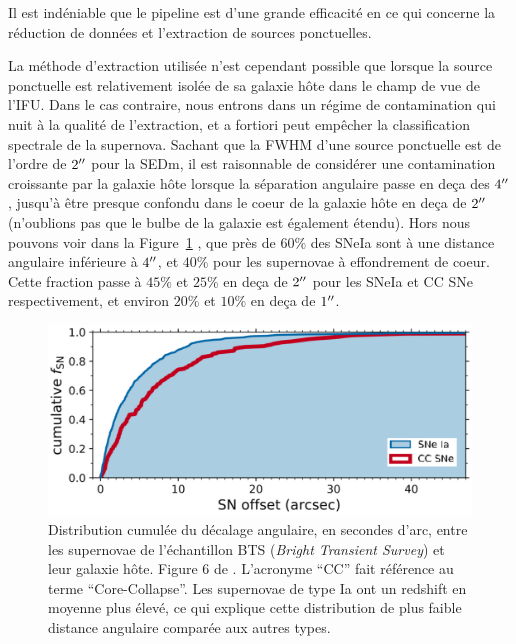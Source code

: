 \documentclass[../main/main.tex]{subfiles}
\begin{document}
Il est indéniable que le pipeline \pysedm est d'une grande efficacité en ce qui concerne la
réduction de données et l'extraction de sources ponctuelles.

La méthode d'extraction utilisée n'est cependant possible que lorsque la
source ponctuelle est relativement
isolée de sa galaxie hôte dans le champ de vue de l'IFU. Dans le cas
contraire, nous entrons dans un régime de contamination qui nuit à la
qualité de l'extraction, et a fortiori peut empêcher la classification
spectrale de la supernova. Sachant que la FWHM d'une source ponctuelle
est de l'ordre de $2^{\prime\prime}$ pour la SEDm, il est raisonnable de
considérer une contamination croissante par la galaxie hôte lorsque la
séparation angulaire passe en deça des $4^{\prime\prime}$, jusqu'à être presque
confondu dans le coeur de la galaxie hôte en deça de $2^{\prime\prime}$
(n'oublions pas que le bulbe de la galaxie
est également étendu). Hors nous pouvons voir dans la
Figure~\ref{fig:cumulsnhostdist} \citep{FremlingZTFspec2020}, que près
de $60\%$ des SNeIa sont à une distance angulaire inférieure à
$4^{\prime\prime}$, et $40\%$ pour les supernovae à effondrement de coeur. Cette
fraction passe à $45\%$ et $25\%$ en deça de $2^{\prime\prime}$ pour les SNeIa
et CC SNe respectivement, et environ $20\%$
et $10\%$ en deça de $1^{\prime\prime}$.


\begin{figure}[ht]
  \begin{minipage}[c]{0.53\textwidth}
    \includegraphics[width=\textwidth]{../figures/03_sedm/cumulsnhostdist.png}
  \end{minipage}\hfill
  \begin{minipage}[c]{0.43\textwidth}
    \caption[Distribution cumulée du décalage angulaire entre les
    supernovae BTS et leur galaxie hôte]{Distribution cumulée du décalage angulaire, en
    secondes d'arc, entre les supernovae de l'échantillon BTS (\textit{Bright Transient Survey}) et leur galaxie hôte.
    Figure 6 de \citet{FremlingZTFspec2020}. L'acronyme ``CC'' fait référence au
    terme ``Core-Collapse''. Les supernovae de type Ia ont
  un redshift en moyenne plus élevé, ce qui explique cette
  distribution de plus faible distance angulaire comparée aux autres types.}\label{fig:cumulsnhostdist}
  \end{minipage}
\end{figure}
\end{document}
